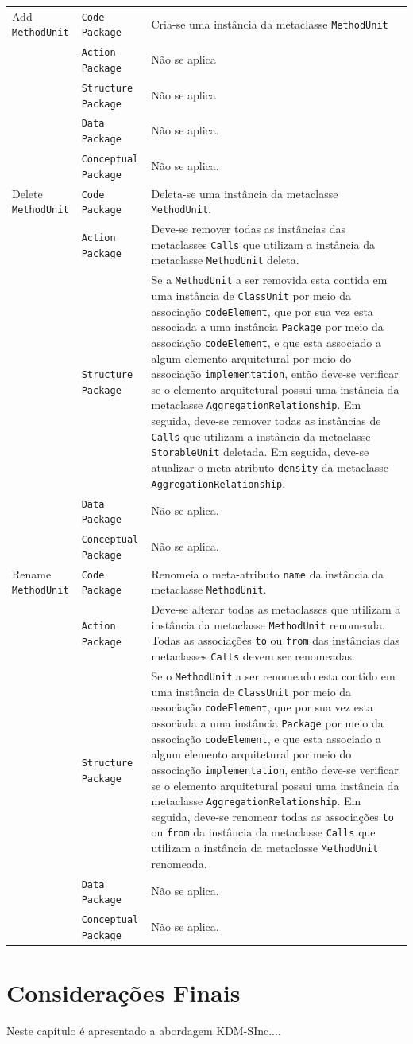 \begin{longtable}{ | m{1.9cm} | m{3.57cm}| m{9.3cm} | }
 Add \texttt{MethodUnit} & \texttt{Code Package} & Cria-se uma instância da metaclasse \texttt{MethodUnit}\tabularnewline
\cline{2-3} 
\cline{2-3} 
 & \texttt{Action Package} & Não se aplica \tabularnewline
 \cline{2-3} 
 & \texttt{Structure Package} & Não se aplica \tabularnewline
\cline{2-3} 
 & \texttt{Data Package} & Não se aplica. \tabularnewline
\cline{2-3} 
 & \texttt{Conceptual Package} & Não se aplica. \tabularnewline
\hline 
 Delete \texttt{MethodUnit} & \texttt{Code Package} & Deleta-se uma instância da metaclasse \texttt{MethodUnit}.\tabularnewline
\cline{2-3} 
& \texttt{Action Package} & Deve-se remover todas as instâncias das metaclasses \texttt{Calls} que utilizam a instância da metaclasse \texttt{MethodUnit} deleta. \tabularnewline
\cline{2-3}
& \texttt{Structure Package} & Se a \texttt{MethodUnit} a ser removida esta contida em uma instância de \texttt{ClassUnit} por meio da associação \texttt{codeElement}, que por sua vez esta associada a uma instância \texttt{Package} por meio da associação \texttt{codeElement}, e que esta associado a algum elemento arquitetural por meio do associação \texttt{implementation}, então deve-se verificar se o elemento arquitetural possui uma instância da metaclasse \texttt{AggregationRelationship}. Em seguida, deve-se remover todas as instâncias de \texttt{Calls} que utilizam a instância da metaclasse \texttt{StorableUnit} deletada. Em seguida, deve-se atualizar o meta-atributo \texttt{density} da metaclasse \texttt{AggregationRelationship}. \tabularnewline
\cline{2-3}
& \texttt{Data Package} & Não se aplica. \tabularnewline
\cline{2-3}
& \texttt{Conceptual Package} & Não se aplica. \tabularnewline
\hline
Rename \texttt{MethodUnit} & \texttt{Code Package} & Renomeia o meta-atributo \texttt{name} da instância da metaclasse \texttt{MethodUnit}.\tabularnewline
\cline{2-3}
& \texttt{Action Package} & Deve-se alterar todas as metaclasses que utilizam a instância da metaclasse \texttt{MethodUnit} renomeada. Todas as associações \texttt{to} ou \texttt{from} das instâncias das metaclasses \texttt{Calls} devem ser renomeadas. \tabularnewline
\cline{2-3}
& \texttt{Structure Package} & Se o \texttt{MethodUnit} a ser renomeado esta contido em uma instância de \texttt{ClassUnit} por meio da associação \texttt{codeElement}, que por sua vez esta associada a uma instância \texttt{Package} por meio da associação \texttt{codeElement}, e que esta associado a algum elemento arquitetural por meio do associação \texttt{implementation}, então deve-se verificar se o elemento arquitetural possui uma instância da metaclasse \texttt{AggregationRelationship}. Em seguida, deve-se renomear todas as associações \texttt{to} ou \texttt{from} da instância da metaclasse \texttt{Calls} que utilizam a instância da metaclasse \texttt{MethodUnit} renomeada. \tabularnewline
\cline{2-3}
& \texttt{Data Package} & Não se aplica. \tabularnewline
\cline{2-3}
& \texttt{Conceptual Package} & Não se aplica. \tabularnewline
 \end{longtable}

\section{Considerações Finais}\label{sec:consideracoes_finals_kdm_sinc}

Neste capítulo é apresentado a abordagem KDM-SInc....